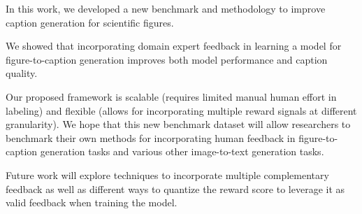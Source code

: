 \documentclass[11pt]{article}
\begin{document}
In this work, we developed a new benchmark and methodology to improve caption generation for scientific figures. 

We showed that incorporating domain expert feedback in learning a model for figure-to-caption generation improves both model performance and caption quality. 


Our proposed framework is scalable (requires limited manual human effort in labeling) and flexible (allows for incorporating multiple reward signals at different granularity). 
We hope that this new benchmark dataset will allow researchers to benchmark their own methods for incorporating human feedback in figure-to-caption generation tasks and various other image-to-text generation tasks.

Future work will explore techniques to incorporate multiple complementary feedback as well as different ways to quantize the reward score to leverage it as valid feedback when training the model.
\end{document}

